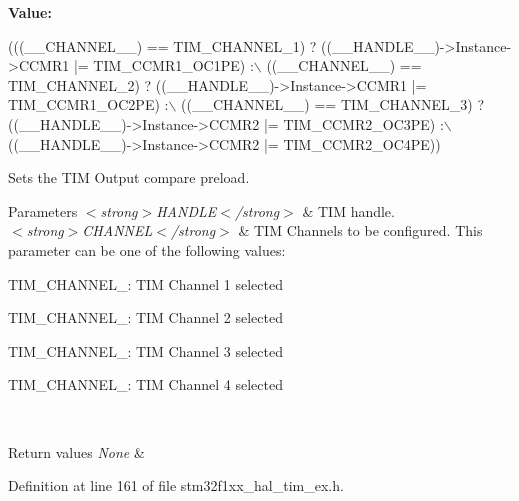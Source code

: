 {\bfseries Value\+:}
\begin{DoxyCode}
(((\_\_CHANNEL\_\_) == TIM\_CHANNEL\_1) ? ((\_\_HANDLE\_\_)->Instance->CCMR1 |= TIM\_CCMR1\_OC1PE) :\(\backslash\)
         ((\_\_CHANNEL\_\_) == TIM\_CHANNEL\_2) ? ((\_\_HANDLE\_\_)->Instance->CCMR1 |= TIM\_CCMR1\_OC2PE) :\(\backslash\)
         ((\_\_CHANNEL\_\_) == TIM\_CHANNEL\_3) ? ((\_\_HANDLE\_\_)->Instance->CCMR2 |= TIM\_CCMR2\_OC3PE) :\(\backslash\)
         ((\_\_HANDLE\_\_)->Instance->CCMR2 |= TIM\_CCMR2\_OC4PE))
\end{DoxyCode}


Sets the T\+IM Output compare preload. 


\begin{DoxyParams}{Parameters}
{\em $<$strong$>$\+H\+A\+N\+D\+L\+E$<$/strong$>$} & T\+IM handle. \\
\hline
{\em $<$strong$>$\+C\+H\+A\+N\+N\+E\+L$<$/strong$>$} & T\+IM Channels to be configured. This parameter can be one of the following values\+: \begin{DoxyItemize}
\item T\+I\+M\+\_\+\+C\+H\+A\+N\+N\+E\+L\+\_\+: T\+IM Channel 1 selected \item T\+I\+M\+\_\+\+C\+H\+A\+N\+N\+E\+L\+\_\+: T\+IM Channel 2 selected \item T\+I\+M\+\_\+\+C\+H\+A\+N\+N\+E\+L\+\_\+: T\+IM Channel 3 selected \item T\+I\+M\+\_\+\+C\+H\+A\+N\+N\+E\+L\+\_\+: T\+IM Channel 4 selected \end{DoxyItemize}
\\
\hline
\end{DoxyParams}

\begin{DoxyRetVals}{Return values}
{\em None} & \\
\hline
\end{DoxyRetVals}


Definition at line 161 of file stm32f1xx\+\_\+hal\+\_\+tim\+\_\+ex.\+h.

